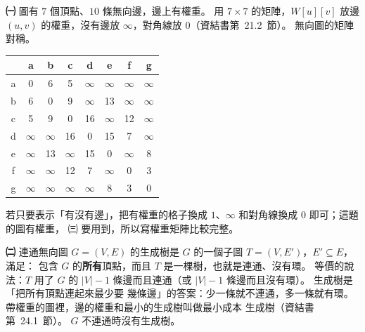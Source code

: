 \begin{pastsoln}
\textbf{㈠} 圖有 $7$ 個頂點、$10$ 條無向邊，邊上有權重。 用 $7 \times 7$ 的矩陣，$W[u][v]$ 放邊
$(u, v)$ 的權重，沒有邊放 $\infty$，對角線放 $0$（資結書第~21.2~節）。 無向圖的矩陣對稱。
\begin{center}
\small
\begin{tabular}{c|ccccccc}
 & a & b & c & d & e & f & g \\
\hline
a & 0 & 6 & 5 & $\infty$ & $\infty$ & $\infty$ & $\infty$ \\
b & 6 & 0 & 9 & $\infty$ & 13 & $\infty$ & $\infty$ \\
c & 5 & 9 & 0 & 16 & $\infty$ & 12 & $\infty$ \\
d & $\infty$ & $\infty$ & 16 & 0 & 15 & 7 & $\infty$ \\
e & $\infty$ & 13 & $\infty$ & 15 & 0 & $\infty$ & 8 \\
f & $\infty$ & $\infty$ & 12 & 7 & $\infty$ & 0 & 3 \\
g & $\infty$ & $\infty$ & $\infty$ & $\infty$ & 8 & 3 & 0 \\
\end{tabular}
\end{center}
若只要表示「有沒有邊」，把有權重的格子換成 $1$、$\infty$ 和對角線換成 $0$ 即可；這題的圖有權重，
㈢ 要用到，所以寫權重矩陣比較完整。

\textbf{㈡} 連通無向圖 $G = (V, E)$ 的生成樹是 $G$ 的一個子圖 $T = (V, E')$，$E' \subseteq E$，滿足：
包含 $G$ 的\textbf{所有}頂點，而且 $T$ 是一棵樹，也就是連通、沒有環。 等價的說法：$T$ 用了
$G$ 的 $|V| - 1$ 條邊而且連通（或 $|V| - 1$ 條邊而且沒有環）。 生成樹是「把所有頂點連起來最少要
幾條邊」的答案：少一條就不連通，多一條就有環。 帶權重的圖裡，邊的權重和最小的生成樹叫做最小成本
生成樹（資結書第~24.1~節）。 $G$ 不連通時沒有生成樹。


\end{pastsoln}
